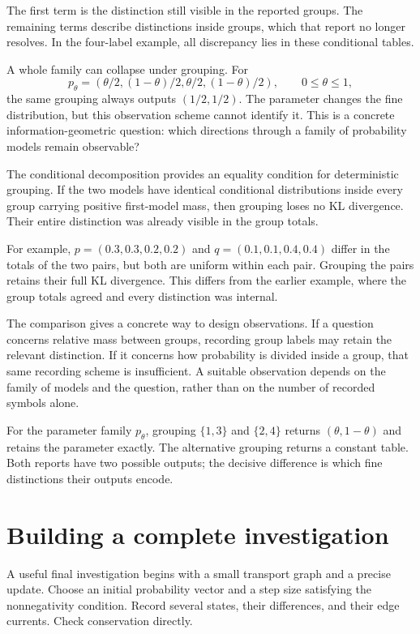 \documentclass[11pt,oneside,openany]{book}
\theoremstyle{definition}
\theoremstyle{remark}
\numberwithin{equation}{chapter}
\begin{document}
The first term is the distinction still visible in the reported groups. The remaining terms describe distinctions inside groups, which that report no longer resolves. In the four-label example, all discrepancy lies in these conditional tables.

A whole family can collapse under grouping. For \[p_\theta=(\theta/2,(1-\theta)/2,\theta/2,(1-\theta)/2),
\qquad 0\leq\theta\leq1,\] the same grouping always outputs \((1/2,1/2)\). The parameter changes the fine distribution, but this observation scheme cannot identify it. This is a concrete information-geometric question: which directions through a family of probability models remain observable?

The conditional decomposition provides an equality condition for deterministic grouping. If the two models have identical conditional distributions inside every group carrying positive first-model mass, then grouping loses no KL divergence. Their entire distinction was already visible in the group totals.

For example, \(p=(0.3,0.3,0.2,0.2)\) and \(q=(0.1,0.1,0.4,0.4)\) differ in the totals of the two pairs, but both are uniform within each pair. Grouping the pairs retains their full KL divergence. This differs from the earlier example, where the group totals agreed and every distinction was internal.

The comparison gives a concrete way to design observations. If a question concerns relative mass between groups, recording group labels may retain the relevant distinction. If it concerns how probability is divided inside a group, that same recording scheme is insufficient. A suitable observation depends on the family of models and the question, rather than on the number of recorded symbols alone.

For the parameter family \(p_\theta\), grouping \(\{1,3\}\) and \(\{2,4\}\) returns \((\theta,1-\theta)\) and retains the parameter exactly. The alternative grouping returns a constant table. Both reports have two possible outputs; the decisive difference is which fine distinctions their outputs encode.

\section{Building a complete investigation}\label{ch10-building-a-complete-investigation}

A useful final investigation begins with a small transport graph and a precise update. Choose an initial probability vector and a step size satisfying the nonnegativity condition. Record several states, their differences, and their edge currents. Check conservation directly.
\end{document}
